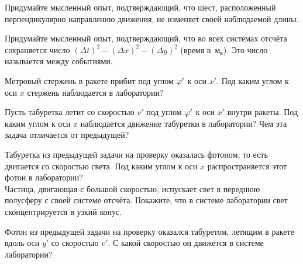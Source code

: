 \documentclass[a4paper,12pt]{article}
\newcommand{\мв}{\,м$_в$}
\begin{document}


Придумайте мысленный опыт, подтверждающий, что шест, расположенный перпендикулярно направлению движения, не изменяет своей наблюдаемой длины.

Придумайте мысленный опыт, подтверждающий, что во всех системах отсчёта сохраняется число $(\Delta t)^2 - (\Delta x)^2 - (\Delta y)^2$ (время в \мв). Это число называется  между событиями.

Метровый стержень в ракете прибит под углом $\varphi'$ к оси $x'$.
Под каким углом  к оси $x$ стержень наблюдается в лаборатории?

Пусть табуретка летит со скоростью $v'$ под углом $\varphi'$ к оси $x'$ внутри ракеты. Под каким углом  к оси $x$ наблюдается движение табуретки в лаборатории? Чем эта задача отличается от предыдущей?

Табуретка из предыдущей задачи на проверку оказалась фотоном, то есть двигается со скоростью света. Под каким углом к оси $x$ распространяется этот фотон в лаборатории?\\
Частица, двигающая с большой скоростью, испускает свет в переднюю полусферу с своей системе отсчёта. Покажите, что в системе лаборатории свет сконцентрируется в узкий конус.

Фотон из предыдущей задачи на проверку оказался табуретом, летящим в ракете вдоль оси $y'$ со скоростью $v'$. С какой скоростью он движется в системе лаборатории?
% 
{}
\end{document}
